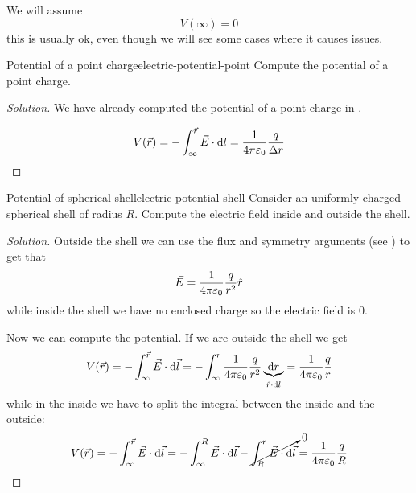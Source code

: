 \documentclass[12pt]{extarticle}
\begin{document}
We will assume
\begin{equation}
    V(\infty) = 0
\end{equation}
this is usually ok, even though we will see some cases where it causes issues.

\begin{example}{Potential of a point charge}{electric-potential-point}
    Compute the potential of a point charge.
\end{example}
\begin{proof}[Solution]
    We have already computed the potential of a point charge in .

    \begin{equation}
        V(\vec r) = - \int_{\infty}^{\vec r} \vec E \cdot \dd{l} = \frac{1}{4 \pi \varepsilon_0} \frac{q}{\Delta r}
    \end{equation}
\end{proof}

\begin{example}{Potential of spherical shell}{electric-potential-shell}
    Consider an uniformly charged spherical shell of radius $R$.
    Compute the electric field inside and outside the shell.
\end{example}

\begin{proof}[Solution]
    Outside the shell we can use the flux and symmetry arguments (see ) to get that
    \begin{equation}
        \vec E = \frac{1}{4 \pi \varepsilon_0} \frac{q}{r^2} \hat r
    \end{equation}
    while inside the shell we have no enclosed charge so the electric field is $0$.

    Now we can compute the potential.
    If we are outside the shell we get
    \begin{equation}
        V(\vec r) = - \int_\infty^{\vec r} \vec E \cdot \dd{\vec l} = - \int_\infty^r \frac{1}{4 \pi \varepsilon_0} \frac{q}{r^2} \underbrace{\dd{r}}_{\hat r \cdot \dd{\vec l}} = \frac{1}{4 \pi \varepsilon_0} \frac{q}{r}
    \end{equation}
    while in the inside we have to split the integral between the inside and the outside:
    \begin{equation}
        V(\vec r) = - \int_\infty^{\vec r} \vec E \cdot \dd{\vec l} = -\int_\infty^R \vec E \cdot \dd{\vec l} - \cancelto{0}{\int_R^r \vec E \cdot \dd{\vec l}} = \frac{1}{4 \pi \varepsilon_0} \frac{q}{R}
    \end{equation}
\end{proof}
\end{document}
